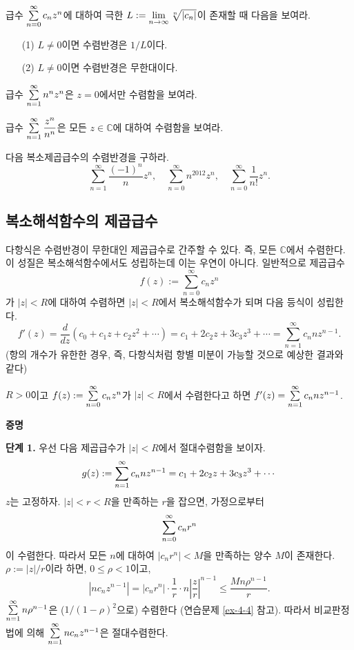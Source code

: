 \begin{salt_exercise}\label{ex-4-6}
급수 $\sum\limits_{n=0}^\infty c_nz^n$에 대하여
극한 $L:=\lim\limits_{n\to\infty} \sqrt[n]{|c_n|}$이 존재할 때
다음을 보여라.
\begin{itemize}
\item[(1)] $L\ne 0$이면 수렴반경은 $1/L$이다.
\item[(2)] $L\ne0$이면 수렴반경은 무한대이다.
\end{itemize}
\end{salt_exercise}

\begin{salt_exercise}\label{ex-4-7}
급수 $\sum\limits_{n=1}^\infty n^nz^n$은
$z=0$에서만 수렴함을 보여라.
\end{salt_exercise}

\begin{salt_exercise}\label{ex-4-8}
급수 $\sum\limits_{n=1}^\infty \displaystyle\frac{z^n}{n^n}$은
모든 $z\in\mathbb C$에 대하여 수렴함을 보여라.
\end{salt_exercise}

\begin{salt_exercise}\label{ex-4-9}
다음 복소제곱급수의 수렴반경을 구하라.
\[
\sum_{n=1}^\infty \dfrac{(-1)^n}{n}z^n,\quad
\sum_{n=0}^\infty n^{2012}z^n, \quad
\sum_{n=0}^\infty \dfrac1{n!}z^n.
\]
\end{salt_exercise}

\subsection{복소해석함수의 제곱급수}

다항식은 수렴반경이 무한대인 제곱급수로 간주할 수 있다.
즉, 모든 $\mathbb C$에서 수렴한다.
이 성질은 복소해석함수에서도 성립하는데
이는 우연이 아니다.
일반적으로 제곱급수 
\[
f(z):= \sum_{n=0}^\infty c_nz^n
\]
가 $|z|<R$에 대하여 수렴하면
$|z|<R$에서 복소해석함수가 되며 
다음 등식이 성립한다.
\[
f'(z) = \dfrac d{dz} (c_0+ c_1z + c_2z^2 + \cdots)
= c_1 + 2c_2z + 3c_3z^3 + \cdots 
= \sum_{n=1}^\infty c_n n z^{n-1}.
\]
(항의 개수가 유한한 경우, 즉, 다항식처럼 
항별 미분이 가능할 것으로 예상한 결과와 같다)

\begin{salt_theorem}\label{thm-4-3}
$R>0$이고 $f(z):= \sum\limits_{n=0}^\infty c_nz^n$가
$|z|<R$에서 수렴한다고 하면
$f'(z) = \sum\limits_{n=1}^\infty c_n n z^{n-1}$.
\end{salt_theorem}

{\bf 증명}

{\bf 단계 1.}
우선 다음 제곱급수가 $|z|<R$에서 절대수렴함을 보이자.
\[
g(z):= \sum\limits_{n=1}^\infty c_n n z^{n-1}
=  c_1 + 2c_2z + 3c_3z^3 + \cdots
\]
$z$는 고정하자.
$|z|<r<R$을 만족하는 $r$을 잡으면, 가정으로부터
\[
\sum\limits_{n=0}^\infty c_nr^n
\]
이 수렴한다. 따라서 모든 $n$에 대하여
$|c_nr^n|<M$을 만족하는 양수 $M$이 존재한다.
$\rho:=|z|/r$이라 하면, $0\le \rho <1$이고,
\[
|nc_nz^{n-1}| = |c_nr^n| \cdot 
\dfrac1r \cdot n \left| \dfrac zr\right|^{n-1}
\le \dfrac{Mn\rho^{n-1}}r.
\]
$\sum\limits_{n=1}^\infty n\rho^{n-1}$은 
($1/(1-\rho)^2$으로) 수렴한다 (연습문제 \ref{ex-4-4} 참고).
따라서 비교판정법에 의해
$\sum\limits_{n=1}^\infty nc_nz^{n-1}$은 절대수렴한다.


